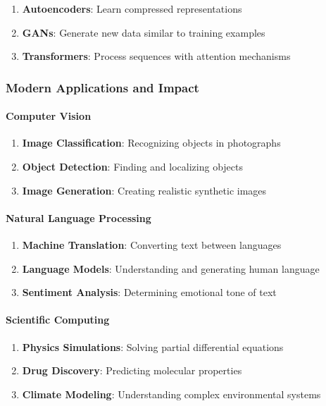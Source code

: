 \begin{enumerate}
\item \textbf{Autoencoders}: Learn compressed representations
\item \textbf{GANs}: Generate new data similar to training examples
\item \textbf{Transformers}: Process sequences with attention mechanisms
\end{enumerate}

\subsubsection{Modern Applications and Impact}
\label{subsubsec:modern-applications}

\paragraph{Computer Vision}
\label{para:computer-vision-applications}

\begin{enumerate}
\item \textbf{Image Classification}: Recognizing objects in photographs
\item \textbf{Object Detection}: Finding and localizing objects
\item \textbf{Image Generation}: Creating realistic synthetic images
\end{enumerate}

\paragraph{Natural Language Processing}
\label{para:nlp-applications}

\begin{enumerate}
\item \textbf{Machine Translation}: Converting text between languages
\item \textbf{Language Models}: Understanding and generating human language
\item \textbf{Sentiment Analysis}: Determining emotional tone of text
\end{enumerate}

\paragraph{Scientific Computing}
\label{para:scientific-computing-applications}

\begin{enumerate}
\item \textbf{Physics Simulations}: Solving partial differential equations
\item \textbf{Drug Discovery}: Predicting molecular properties
\item \textbf{Climate Modeling}: Understanding complex environmental systems
\end{enumerate}

